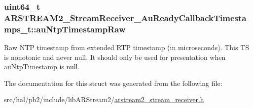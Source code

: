 \subsubsection[{\texorpdfstring{au\+Ntp\+Timestamp\+Raw}{auNtpTimestampRaw}}]{\setlength{\rightskip}{0pt plus 5cm}uint64\+\_\+t A\+R\+S\+T\+R\+E\+A\+M2\+\_\+\+Stream\+Receiver\+\_\+\+Au\+Ready\+Callback\+Timestamps\+\_\+t\+::au\+Ntp\+Timestamp\+Raw}\hypertarget{struct_a_r_s_t_r_e_a_m2___stream_receiver___au_ready_callback_timestamps__t_a0f72682edcdbcc964930d2a9c0e7e85c}{}\label{struct_a_r_s_t_r_e_a_m2___stream_receiver___au_ready_callback_timestamps__t_a0f72682edcdbcc964930d2a9c0e7e85c}
Raw N\+TP timestamp from extended R\+TP timestamp (in microseconds). This TS is nonotonic and never null. It should only be used for presentation when au\+Ntp\+Timestamp is null. 

The documentation for this struct was generated from the following file\+:\begin{DoxyCompactItemize}
\item 
src/hal/pb2/include/lib\+A\+R\+Stream2/\hyperlink{arstream2__stream__receiver_8h}{arstream2\+\_\+stream\+\_\+receiver.\+h}\end{DoxyCompactItemize}
